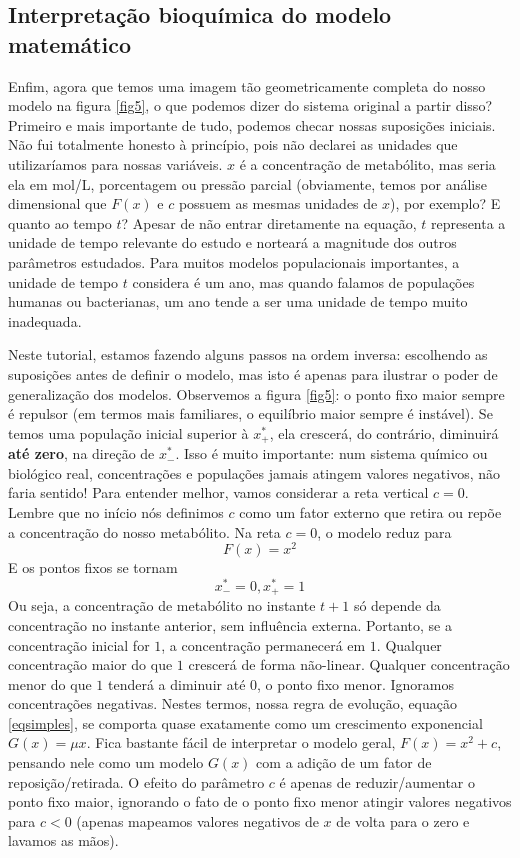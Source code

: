 \documentclass{article}
\begin{document}
\subsection*{Interpretação bioquímica do modelo matemático}
Enfim, agora que temos uma imagem tão geometricamente completa do nosso modelo na figura \ref{fig5}, o que podemos dizer do sistema original a partir disso? Primeiro e mais importante de tudo, podemos checar nossas suposições iniciais. Não fui totalmente honesto à princípio, pois não declarei as unidades que utilizaríamos para nossas variáveis. $x$ é a concentração de metabólito, mas seria ela em mol/L, porcentagem ou pressão parcial (obviamente, temos por análise dimensional que $F(x)$ e $c$ possuem as mesmas unidades de $x$), por exemplo? E quanto ao tempo $t$? Apesar de não entrar diretamente na equação, $t$ representa a unidade de tempo relevante do estudo e norteará a magnitude dos outros parâmetros estudados. Para muitos modelos populacionais importantes, a unidade de tempo $t$ considera é um ano, mas quando falamos de populações humanas ou bacterianas, um ano tende a ser uma unidade de tempo muito inadequada. 

Neste tutorial, estamos fazendo alguns passos na ordem inversa: escolhendo as suposições antes de definir o modelo, mas isto é apenas para ilustrar o poder de generalização dos modelos. Observemos a figura \ref{fig5}: o ponto fixo maior sempre é repulsor (em termos mais familiares, o equilíbrio maior sempre é instável). Se temos uma população inicial superior à $x^*_+$, ela crescerá, do contrário, diminuirá \textbf{até zero}, na direção de $x^*_-$. Isso é muito importante: num sistema químico ou biológico real, concentrações e populações jamais atingem valores negativos, não faria sentido! Para entender melhor, vamos considerar a reta vertical $c = 0$. Lembre que no início nós definimos $c$ como um fator externo que retira ou repõe a concentração do nosso metabólito. Na reta $c = 0$, o modelo reduz para 
\begin{equation}
F(x) = x^2
\label{eqsimples}
\end{equation}
E os pontos fixos se tornam
\begin{equation}
{x^*_- = 0, x^*_+ = 1}
\end{equation}
Ou seja, a concentração de metabólito no instante $t + 1$ só depende da concentração no instante anterior, sem influência externa. Portanto, se a concentração inicial for $1$, a concentração permanecerá em $1$. Qualquer concentração maior do que $1$ crescerá de forma não-linear. Qualquer concentração menor do que $1$ tenderá a diminuir até $0$, o ponto fixo menor. Ignoramos concentrações negativas. Nestes termos, nossa regra de evolução, equação \ref{eqsimples}, se comporta quase exatamente como um crescimento exponencial $G(x) = \mu x$. Fica bastante fácil de interpretar o modelo geral, $F(x) = x^2 + c$, pensando nele como um modelo $G(x)$ com a adição de um fator de reposição/retirada. O efeito do parâmetro $c$ é apenas de reduzir/aumentar o ponto fixo maior, ignorando o fato de o ponto fixo menor atingir valores negativos para $c < 0$ (apenas mapeamos valores negativos de $x$ de volta para o zero e lavamos as mãos). 
\end{document}
